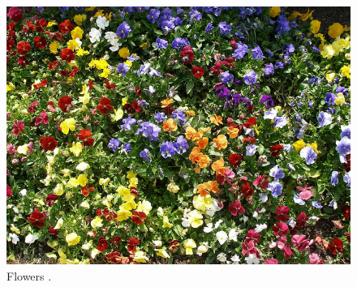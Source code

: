 \begin{refsection}
  \begin{figure}[h!]
    \centering
    \includegraphics[scale=0.05]{tikz_img/flowers.jpg}
    \caption{Flowers \cite{turner06:_flower}.}
    \label{fig:flowers}
  \end{figure}

  \FloatBarrier

  \printbibliography[heading=subbibliography]

\end{refsection}